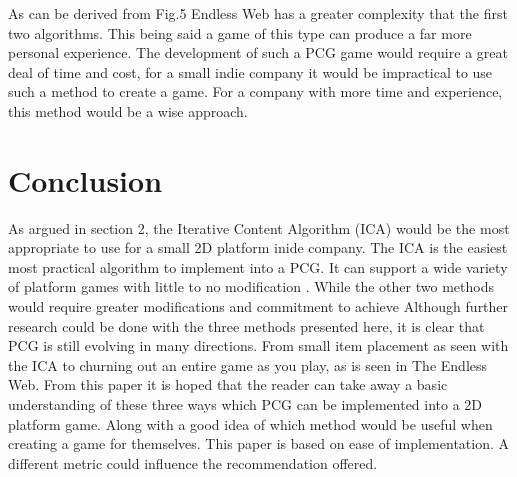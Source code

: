 \documentclass{scrartcl}
\begin{document}
As can be derived from Fig.5 Endless Web has a greater complexity that the first two algorithms. This being said a game of this type can produce a far more personal experience\cite{web}. The development of such a PCG game would require a great deal of time and cost, for a small indie company it would be impractical to use such a method to create a game. For a company with more time and experience, this method would be a wise approach. 


\section{Conclusion}
As argued in section 2, the Iterative Content Algorithm (ICA) would be the most appropriate to use for a small 2D platform inide company. The ICA is the easiest most practical algorithm to implement into a PCG. It can support a wide variety of platform games with little to no modification \cite{fausto}. While the other two methods would require greater modifications and commitment to achieve\cite{walaa,web}
\newline
Although further research could be done with the three methods presented here, it is clear that PCG is still evolving in many directions. From small item placement as seen with the ICA to churning out an entire game as you play, as is seen in The Endless Web. From this paper it is hoped that the reader can take away a basic understanding of these three ways which PCG can be implemented into a 2D platform game. Along with a good idea of which method would be useful when creating a game for themselves. This paper is based on ease of implementation. A different metric could influence the recommendation offered.



\end{document}
